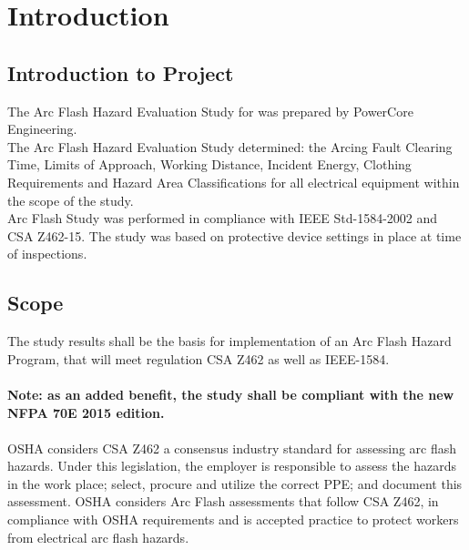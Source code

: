 
\section{Introduction}
\label{af:intro}

\subsection{Introduction to Project}
\label{af:intro:proj}

The Arc Flash Hazard Evaluation Study for \Customer{} was prepared by PowerCore Engineering.\\

The Arc Flash Hazard Evaluation Study determined: the Arcing Fault Clearing Time, Limits of Approach, Working Distance, Incident Energy, Clothing Requirements and Hazard Area Classifications for all electrical equipment within the scope of the study.\\

Arc Flash Study was performed in compliance with IEEE Std-1584-2002 and CSA Z462-15. The study was based on protective device settings in place at time of inspections.

\subsection{Scope}
\label{af:intro:scope}

The study results shall be the basis for implementation of an Arc Flash Hazard Program, that will meet regulation CSA Z462 as well as IEEE-1584.\\
\\
\textbf{Note: as an added benefit, the study shall be compliant with the new NFPA 70E 2015 edition.}\\
\\
OSHA considers CSA Z462 a consensus industry standard for assessing arc flash hazards. Under this legislation, the employer is responsible to assess the hazards in the work place; select, procure and utilize the correct PPE; and document this assessment. OSHA considers Arc Flash assessments that follow CSA Z462, in compliance with OSHA requirements and is accepted practice to protect workers from electrical arc flash hazards.\\


